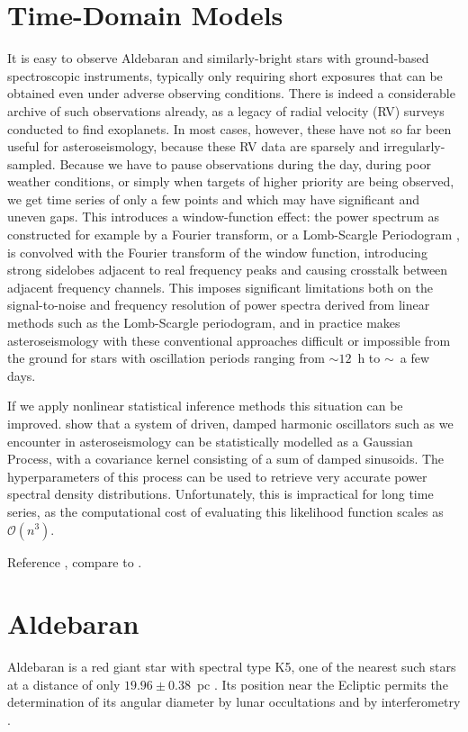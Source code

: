 \documentclass[modern]{aastex61}
\begin{document}
\section{Time-Domain Models}

It is easy to observe Aldebaran and similarly-bright stars with ground-based spectroscopic instruments, typically only requiring short exposures that can be obtained even under adverse observing conditions. There is indeed a considerable archive of such observations already, as a legacy of radial velocity (RV) surveys conducted to find exoplanets. In most cases, however, these have not so far been useful for asteroseismology, because these RV data are sparsely and irregularly-sampled. Because we have to pause observations during the day, during poor weather conditions, or simply when targets of higher priority are being observed, we get time series of only a few points and which may have significant and uneven gaps. This introduces a window-function effect: the power spectrum as constructed for example by a Fourier transform, or a Lomb-Scargle Periodogram \citep{lomb,scargle}, is convolved with the Fourier transform of the window function, introducing strong sidelobes adjacent to real frequency peaks and causing crosstalk between adjacent frequency channels. This imposes significant limitations both on the signal-to-noise and frequency resolution of power spectra derived from linear methods such as the Lomb-Scargle periodogram, and in practice makes asteroseismology with these conventional approaches difficult or impossible from the ground for stars with oscillation periods ranging from $\sim 12$~h to $\sim$~a few days. 

If we apply nonlinear statistical inference methods this situation can be improved. \citet{brewer2009} show that a system of driven, damped harmonic oscillators such as we encounter in asteroseismology can be statistically modelled as a Gaussian Process, with a covariance kernel consisting of a sum of damped sinusoids. The hyperparameters of this process can be used to retrieve very accurate power spectral density distributions. Unfortunately, this is impractical for long time series, as the computational cost of evaluating this likelihood function scales as $\mathcal{O}(n^3)$. 

Reference \citet{Kelly2014}, compare to \citet{Foreman-Mackey2017}.

\section{Aldebaran}
Aldebaran is a red giant star with spectral type K5, one of the nearest such stars at a distance of only $19.96 \pm 0.38$~pc \citep{hipparcos}. Its position near the Ecliptic permits the determination of its angular diameter by lunar occultations and by interferometry \citep[$20.58 \pm 0.03$ mas;][]{richichi2005,1979ApJ...228L.111B,brown1979,panek1980}.
\end{document}
